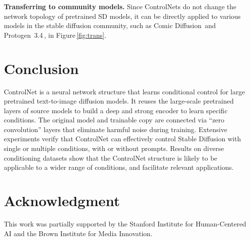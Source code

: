 \documentclass[10pt,twocolumn,letterpaper]{article}
\def\para#1{\vspace{0.25em}\noindent\textbf{#1}}
\begin{document}
	\para{Transferring to community models.}
	Since ControlNets do not change the network topology of pretrained SD models, it can be directly applied to various models in the stable diffusion community, such as Comic Diffusion\,\cite{comicdiff} and Protogen~3.4\,\cite{protogen}, in Figure\,\ref{fig:trans}. 
	
	\section{Conclusion}
	\label{sec:conclusion}
	
	ControlNet is a neural network structure that learns
	conditional control for large pretrained text-to-image
	diffusion models. It reuses the large-scale pretrained layers
	of source models to build a deep and strong encoder to learn
	specific conditions. The original model and trainable copy are
	connected via ``zero convolution'' layers that eliminate
	harmful noise during training.  Extensive experiments verify
	that ControlNet can effectively control Stable Diffusion with
	single or multiple conditions, with or without prompts.
	Results on diverse conditioning datasets show that the
	ControlNet structure is likely to be applicable to a wider
	range of conditions, and facilitate relevant applications.

\section*{Acknowledgment}

This work was partially supported by the Stanford Institute for Human-Centered AI and the Brown Institute for Media Innovation. 

	{\small
		
		
	}
	
\end{document}
